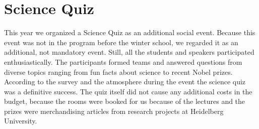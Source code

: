 \section*{Science Quiz}
This year we organized a Science Quiz as an additional social event.
Because this event was not in the program before the winter school, we regarded it as an additional, not mandatory event.
Still, all the students and speakers participated enthusiastically.
The participants formed teams and answered questions from diverse topics ranging from fun facts about science to recent Nobel prizes.
According to the survey and the atmosphere during the event the science quiz was a definitive success.
The quiz itself did not cause any additional costs in the budget, because the rooms were booked for us because of the lectures and the prizes were merchandising articles from research projects at Heidelberg University.